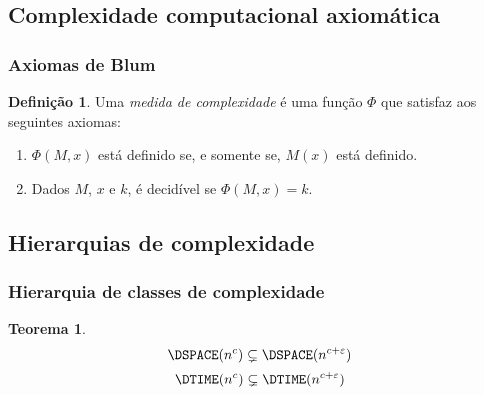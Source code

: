 \documentclass[utf8,notheorems]{beamer}
\newtheorem*{theorem}{Teorema}
\theoremstyle{definition}
\newtheorem*{definition}{Definição}
\begin{document}
\subsection{Complexidade computacional axiomática}
\begin{frame}
    \frametitle{Axiomas de Blum}
    \begin{definition}
        Uma \emph{medida de complexidade}
        é uma função $\Phi$ que satisfaz aos seguintes axiomas:
        \begin{enumerate}
            \item
                $\Phi(M, x)$ está definido
                se, e somente se,
                $M(x)$ está definido.
            \item
                Dados $M$, $x$ e $k$,
                é decidível se $\Phi(M, x) = k$.
        \end{enumerate}
    \end{definition}
\end{frame}

\subsection{Hierarquias de complexidade}
\begin{frame}
    \frametitle{Hierarquia de classes de complexidade}

    \begin{theorem}
        \begin{displaymath}
            \DSPACE(n^c) \subsetneq \DSPACE(n^{c+\varepsilon})
        \end{displaymath}
        \begin{displaymath}
            \DTIME(n^c) \subsetneq \DTIME(n^{c+\varepsilon})
        \end{displaymath}
    \end{theorem}

    \centering
\end{frame}
\end{document}
